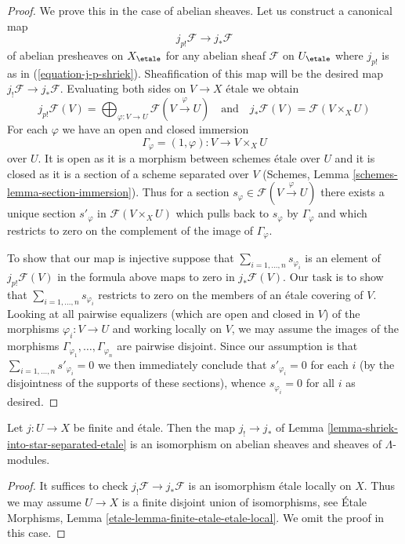 \begin{proof}
We prove this in the case of abelian sheaves. Let us construct a canonical map
$$
j_{p!}\mathcal{F} \to j_*\mathcal{F}
$$
of abelian presheaves on $X_\etale$ for any abelian sheaf
$\mathcal{F}$ on $U_\etale$ where $j_{p!}$ is as in
(\ref{equation-j-p-shriek}). Sheafification of this map will
be the desired map $j_!\mathcal{F} \to j_*\mathcal{F}$.
Evaluating both sides on $V \to X$ \'etale we obtain
$$
j_{p!}\mathcal{F}(V) =
\bigoplus\nolimits_{\varphi : V \to U} \mathcal{F}(V \xrightarrow{\varphi} U)
\quad\text{and}\quad
j_*\mathcal{F}(V) = \mathcal{F}(V \times_X U)
$$
For each $\varphi$ we have an open and closed immersion
$$
\Gamma_\varphi = (1, \varphi) : V \longrightarrow V \times_X U
$$
over $U$. It is open as it is a morphism between schemes \'etale
over $U$ and it is closed as it is a section of a scheme separated
over $V$ (Schemes, Lemma \ref{schemes-lemma-section-immersion}).
Thus for a section $s_\varphi \in \mathcal{F}(V \xrightarrow{\varphi} U)$
there exists a unique section $s'_\varphi$ in $\mathcal{F}(V \times_X U)$
which pulls back to $s_\varphi$ by $\Gamma_\varphi$
and which restricts to zero on the complement of the image of $\Gamma_\varphi$.

\medskip\noindent
To show that our map is injective suppose that
$\sum_{i = 1, \ldots, n} s_{\varphi_i}$ is an element of
$j_{p!}\mathcal{F}(V)$ in the formula above maps to zero
in $j_*\mathcal{F}(V)$. Our task is to show that
$\sum_{i = 1, \ldots, n} s_{\varphi_i}$ restricts to zero
on the members of an \'etale covering of $V$.
Looking at all pairwise equalizers
(which are open and closed in $V$) of the morphisms
$\varphi_i : V \to U$ and working locally on $V$, we
may assume the images of the morphisms
$\Gamma_{\varphi_1}, \ldots, \Gamma_{\varphi_n}$
are pairwise disjoint. Since our assumption is that
$\sum_{i = 1, \ldots, n} s'_{\varphi_i} = 0$
we then immediately conclude that $s'_{\varphi_i} = 0$
for each $i$ (by the disjointness of the supports of these
sections), whence $s_{\varphi_i} = 0$ for all $i$ as desired.
\end{proof}

\begin{lemma}
\label{lemma-shriek-equals-star-finite-etale}
Let $j : U \to X$ be finite and \'etale. Then the map
$j_! \to j_*$ of Lemma \ref{lemma-shriek-into-star-separated-etale}
is an isomorphism
on abelian sheaves and sheaves of $\Lambda$-modules.
\end{lemma}

\begin{proof}
It suffices to check $j_!\mathcal{F} \to j_*\mathcal{F}$
is an isomorphism \'etale locally on $X$.
Thus we may assume $U \to X$ is a finite disjoint union
of isomorphisms, see
\'Etale Morphisms, Lemma \ref{etale-lemma-finite-etale-etale-local}.
We omit the proof in this case.
\end{proof}

